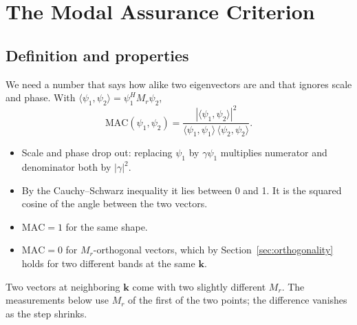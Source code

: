 \section{The Modal Assurance Criterion}

\subsection{Definition and properties}
We need a number that says how alike two eigenvectors are and that ignores scale
and phase. With $\langle \psi_1, \psi_2\rangle = \psi_1^H M_r \psi_2$,
\begin{equation}
  \mathrm{MAC}(\psi_1, \psi_2) = \frac{|\langle\psi_1, \psi_2\rangle|^2}{\langle\psi_1, \psi_1\rangle\,\langle\psi_2, \psi_2\rangle} .
\end{equation}
\begin{itemize}
  \item Scale and phase drop out: replacing $\psi_1$ by $\gamma\psi_1$ multiplies
        numerator and denominator both by $|\gamma|^2$.
  \item By the Cauchy--Schwarz inequality it lies between 0 and 1. It is the squared
        cosine of the angle between the two vectors.
  \item $\mathrm{MAC} = 1$ for the same shape.
  \item $\mathrm{MAC} = 0$ for $M_r$-orthogonal vectors, which by
        Section~\ref{sec:orthogonality} holds for two different bands at the same
        $\mathbf{k}$.
\end{itemize}
Two vectors at neighboring $\mathbf{k}$ come with two slightly different $M_r$. The
measurements below use $M_r$ of the first of the two points; the difference
vanishes as the step shrinks.

